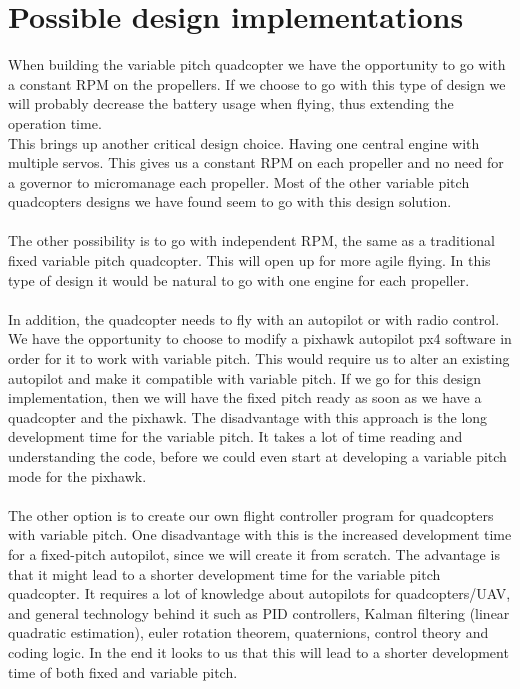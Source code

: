 \section{Possible design implementations}

When building the variable pitch quadcopter we have the opportunity to go with a constant RPM on the propellers. If we choose to go with this type of design we will probably decrease the battery usage when flying, thus extending the operation time.  \\
This brings up another critical design choice. Having one central engine with multiple servos. This gives us a constant RPM on each propeller and no need for a governor to micromanage each propeller. Most of the other variable pitch quadcopters designs we have found seem to go with this design solution. 
\\\\
The other possibility is to go with independent RPM, the same as a traditional fixed variable pitch quadcopter. This will open up for more agile flying. In this type of design it would be natural to go with one engine for each propeller. 
\\\\
In addition, the quadcopter needs to fly with an autopilot or with radio control. We have the opportunity to choose to modify a pixhawk autopilot px4 software in order for it to work with variable pitch. This would require us to alter an existing autopilot and make it compatible with variable pitch. If we go for this design implementation, then we will have the fixed pitch ready as soon as we have a quadcopter and the pixhawk. The disadvantage with this approach is the long development time for the variable pitch. It takes a lot of time reading and understanding the code, before we could even start at developing a variable pitch mode for the pixhawk. \\
\\
The other option is to create our own flight controller program for quadcopters with variable pitch. One disadvantage with this is the increased development time for a fixed-pitch autopilot, since we will create it from scratch. The advantage is that it might lead to a shorter development time for the variable pitch quadcopter. It requires a lot of knowledge about autopilots for quadcopters/UAV, and general technology behind it such as PID controllers, Kalman filtering (linear quadratic estimation), euler rotation theorem, quaternions, control theory and coding logic. In the end it looks to us that this will lead to a shorter development time of both fixed and variable pitch.